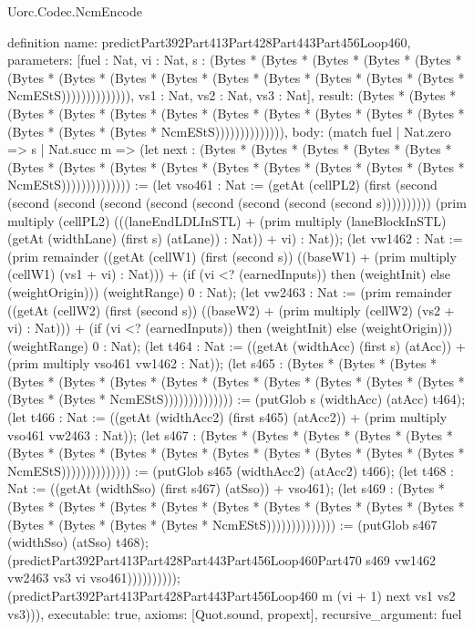 \begin{lexlean}{Uorc.Codec.NcmEncode}
\begin{semanticmodule}
definition{
  name: predictPart392Part413Part428Part443Part456Loop460,
  parameters: [fuel : Nat, vi : Nat, s : (Bytes * (Bytes * (Bytes * (Bytes * (Bytes * (Bytes * (Bytes * (Bytes * (Bytes * (Bytes * (Bytes * (Bytes * (Bytes * (Bytes * NcmEStS)))))))))))))), vs1 : Nat, vs2 : Nat, vs3 : Nat],
  result: (Bytes * (Bytes * (Bytes * (Bytes * (Bytes * (Bytes * (Bytes * (Bytes * (Bytes * (Bytes * (Bytes * (Bytes * (Bytes * (Bytes * NcmEStS)))))))))))))),
  body: (match fuel
    | Nat.zero => s
    | Nat.succ m => (let next : (Bytes * (Bytes * (Bytes * (Bytes * (Bytes * (Bytes * (Bytes * (Bytes * (Bytes * (Bytes * (Bytes * (Bytes * (Bytes * (Bytes * NcmEStS)))))))))))))) := (let vso461 : Nat := (getAt (cellPL2) (first (second (second (second (second (second (second (second (second (second s)))))))))) (prim multiply (cellPL2) (((laneEndLDLInSTL) + (prim multiply (laneBlockInSTL) (getAt (widthLane) (first s) (atLane)) : Nat)) + vi) : Nat)); (let vw1462 : Nat := (prim remainder ((getAt (cellW1) (first (second s)) ((baseW1) + (prim multiply (cellW1) (vs1 + vi) : Nat))) + (if (vi <? (earnedInputs)) then (weightInit) else (weightOrigin))) (weightRange) 0 : Nat); (let vw2463 : Nat := (prim remainder ((getAt (cellW2) (first (second s)) ((baseW2) + (prim multiply (cellW2) (vs2 + vi) : Nat))) + (if (vi <? (earnedInputs)) then (weightInit) else (weightOrigin))) (weightRange) 0 : Nat); (let t464 : Nat := ((getAt (widthAcc) (first s) (atAcc)) + (prim multiply vso461 vw1462 : Nat)); (let s465 : (Bytes * (Bytes * (Bytes * (Bytes * (Bytes * (Bytes * (Bytes * (Bytes * (Bytes * (Bytes * (Bytes * (Bytes * (Bytes * (Bytes * NcmEStS)))))))))))))) := (putGlob s (widthAcc) (atAcc) t464); (let t466 : Nat := ((getAt (widthAcc2) (first s465) (atAcc2)) + (prim multiply vso461 vw2463 : Nat)); (let s467 : (Bytes * (Bytes * (Bytes * (Bytes * (Bytes * (Bytes * (Bytes * (Bytes * (Bytes * (Bytes * (Bytes * (Bytes * (Bytes * (Bytes * NcmEStS)))))))))))))) := (putGlob s465 (widthAcc2) (atAcc2) t466); (let t468 : Nat := ((getAt (widthSso) (first s467) (atSso)) + vso461); (let s469 : (Bytes * (Bytes * (Bytes * (Bytes * (Bytes * (Bytes * (Bytes * (Bytes * (Bytes * (Bytes * (Bytes * (Bytes * (Bytes * (Bytes * NcmEStS)))))))))))))) := (putGlob s467 (widthSso) (atSso) t468); (predictPart392Part413Part428Part443Part456Loop460Part470 s469 vw1462 vw2463 vs3 vi vso461)))))))))); (predictPart392Part413Part428Part443Part456Loop460 m (vi + 1) next vs1 vs2 vs3))),
  executable: true,
  axioms: [Quot.sound, propext],
  recursive_argument: fuel
}


\end{semanticmodule}
\end{lexlean}
